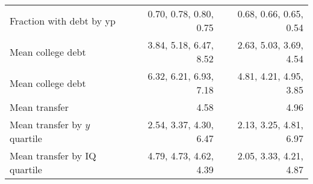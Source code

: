 \begin{tabular}{lrr}
Fraction with debt by yp & 0.70, 0.78, 0.80, 0.75  & 0.68, 0.66, 0.65, 0.54  \\ 
Mean college debt & 3.84, 5.18, 6.47, 8.52  & 2.63, 5.03, 3.69, 4.54  \\ 
Mean college debt & 6.32, 6.21, 6.93, 7.18  & 4.81, 4.21, 4.95, 3.85  \\ 
Mean transfer & 4.58  & 4.96  \\ 
Mean transfer by $y$ quartile & 2.54, 3.37, 4.30, 6.47  & 2.13, 3.25, 4.81, 6.97  \\ 
Mean transfer by IQ quartile & 4.79, 4.73, 4.62, 4.39  & 2.05, 3.33, 4.21, 4.87  \\ 
\hline
\end{tabular}%
